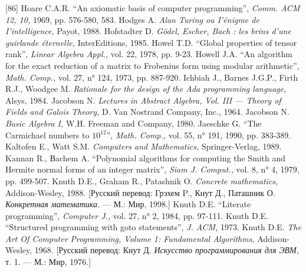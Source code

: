 \documentclass{../../template/mai_book}
\begin{document}
[86] Hoare C.A.R. “An axiomatic basis of computer programming”, {\itshape Comm. ACM 12, 10,} 1969, pp. 576-580, 583. \newline
[87] Hodges A. {\itshape Alan Turing ou I’\'{e}nigme de I’intelligence,} Payot, 1988. \newline
[88] Hofstadter D. {\itshape G\"odel, Escher, Bach : les brins d’une guirlande \'{e}ternelle,} InterEditions, 1985. \newline
[89] Howel T.D. “Global properties of tensor rank”, {\itshape Linear Algebra Appl.,} vol. 22, 1978, pp. 9-23. \newline
[90] Howell J.A. “An algorithm for the exact reduction of a matrix to Frobenius form using modular arithmetic”, {\itshape Math. Comp.,} vol. 27, n° 124, 1973, pp. 887-920. \newline
[91] Ichbiah J., Barnes J.G.P., Firth R.J., Woodgee M. {\itshape Rationale
for the design of the Ada programming language,} Alsys, 1984. \newline
[92] Jacobson N. {\itshape Lectures in Abstract Algebra, Vol. III — Theory of Fields and Galois Theory,} D. Van Nostrand Company, Inc., 1964. \newline
[93] Jacobson N. {\itshape Basic Algebra I,} W.H. Freeman and Company, 1980. \newline
[94] Jaeschke G. “The Carmichael numbers to $10^{12}$”, {\itshape Math. Comp.,} vol. 55, n° 191, 1990, pp. 383-389. \newline
[95] Kaltofen E., Watt S.M. {\itshape Computers and Mathematics,} Springer-Verlag, 1989. \newline
\newpage
\noindent
[96] Kannan R., Вachem A. “Polynomial algorithms for computing the
Smith and Hermite normal forms of an integer matrix”, {\itshape Siam J. Comput.,} vol. 8, n° 4, 1979, pp. 499-507. \newline
[97] Knuth D.E., Graham R., Patashnik O. {\itshape Concrete mathematics,} Addison-Wesley, 1988. [Русский перевод: Грэхем P., Кнут Д., Паташник О. {\itshape Конкретная математика.} — М.: Мир, 1998.] \newline
[98] Knuth D.E. “Literate programming”, {\itshape Computer J.,} vol. 27, n° 2, 1984, pp. 97-111. \newline
[99] Knuth D.E. “Structured programming with goto statements”, {\itshape J. ACM,} 1973. \newline
[100] Knuth D.E. {\itshape The Art Of Computer Programming, Volume 1: Fundamental Algorithms,} Addison-Wesley, 1968. [Русский перевод: Кнут Д.
{\itshape Искусство программирования для ЭВМ,} т. 1. — М.: Мир, 1976.] \newline
\end{document}
